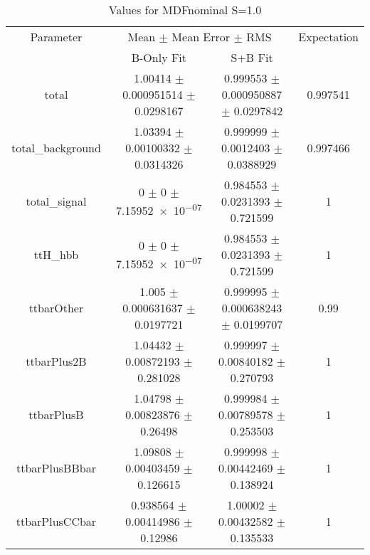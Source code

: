 \begin{table}
\centering
\caption{Values for MDFnominal S=1.0}
\begin{tabular}{cccc}
\toprule
Parameter & \multicolumn{2}{c}{Mean $\pm$ Mean Error $\pm$ RMS} & Expectation\\
 & B-Only Fit & S+B Fit & \\
\midrule
total & \num{1.00414} $\pm$ \num{0.000951514} $\pm$ \num{0.0298167} & \num{0.999553} $\pm$ \num{0.000950887} $\pm$ \num{0.0297842} & \num{0.997541}\\
total\_background & \num{1.03394} $\pm$ \num{0.00100332} $\pm$ \num{0.0314326} & \num{0.999999} $\pm$ \num{0.0012403} $\pm$ \num{0.0388929} & \num{0.997466}\\
total\_signal & \num{0} $\pm$ \num{0} $\pm$ \num{7.15952e-07} & \num{0.984553} $\pm$ \num{0.0231393} $\pm$ \num{0.721599} & \num{1}\\
ttH\_hbb & \num{0} $\pm$ \num{0} $\pm$ \num{7.15952e-07} & \num{0.984553} $\pm$ \num{0.0231393} $\pm$ \num{0.721599} & \num{1}\\
ttbarOther & \num{1.005} $\pm$ \num{0.000631637} $\pm$ \num{0.0197721} & \num{0.999995} $\pm$ \num{0.000638243} $\pm$ \num{0.0199707} & \num{0.99}\\
ttbarPlus2B & \num{1.04432} $\pm$ \num{0.00872193} $\pm$ \num{0.281028} & \num{0.999997} $\pm$ \num{0.00840182} $\pm$ \num{0.270793} & \num{1}\\
ttbarPlusB & \num{1.04798} $\pm$ \num{0.00823876} $\pm$ \num{0.26498} & \num{0.999984} $\pm$ \num{0.00789578} $\pm$ \num{0.253503} & \num{1}\\
ttbarPlusBBbar & \num{1.09808} $\pm$ \num{0.00403459} $\pm$ \num{0.126615} & \num{0.999998} $\pm$ \num{0.00442469} $\pm$ \num{0.138924} & \num{1}\\
ttbarPlusCCbar & \num{0.938564} $\pm$ \num{0.00414986} $\pm$ \num{0.12986} & \num{1.00002} $\pm$ \num{0.00432582} $\pm$ \num{0.135533} & \num{1}\\
\bottomrule
\end{tabular}
\end{table}